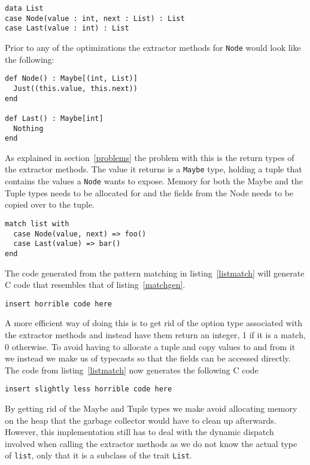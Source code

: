 \documentclass[10pt]{report}
\def\code#1{\texttt{#1}} %
\begin{document}
\begin{lstlisting}[language=encore]
data List
case Node(value : int, next : List) : List
case Last(value : int) : List
\end{lstlisting}

\par{Prior to any of the optimizations the extractor methods for \code{Node} would look like the following:}

\begin{lstlisting}[language=encore,caption={Extractor methods before optimization}]
def Node() : Maybe[(int, List)]
  Just((this.value, this.next))
end

def Last() : Maybe[int]
  Nothing
end
\end{lstlisting}

\par{As explained in section~\ref{problems} the problem with this is the return types of the extractor methods. The value it returns is a \code{Maybe} type, holding a tuple that contains the values a \code{Node} wants to expose. Memory for both the Maybe and the Tuple types needs to be allocated for and the fields from the Node needs to be copied over to the tuple.}


\begin{lstlisting}[language=encore,caption={Pattern matching on a List},label=listmatch]
match list with
  case Node(value, next) => foo()
  case Last(value) => bar()
end
\end{lstlisting}

\par{The code generated from the pattern matching in listing~\ref{listmatch} will generate C code that resembles that of listing~\ref{matchgen}.}


\begin{lstlisting}[language=encore,caption={Pattern matching on a List},label=matchgen]
  insert horrible code here
\end{lstlisting}

\par{A more efficient way of doing this is to get rid of the option type associated with the extractor methods and instead have them return an integer, 1 if it is a match, 0 otherwise. To avoid having to allocate a tuple and copy values to and from it we instead we make us of typecasts so that the fields can be accessed directly. The code from listing~\ref{listmatch} now generates the following C code}

\begin{lstlisting}[language=encore,caption={Pattern matching on a List},label=matchgen2]
  insert slightly less horrible code here
\end{lstlisting}
\par{By getting rid of the Maybe and Tuple types we make avoid allocating memory on the heap that the garbage collector would have to clean up afterwards. However, this implementation still has to deal with the dynamic dispatch involved when calling the extractor methods as we do not know the actual type of \code{list}, only that it is a subclass of the trait \code{List}.}
\end{document}
